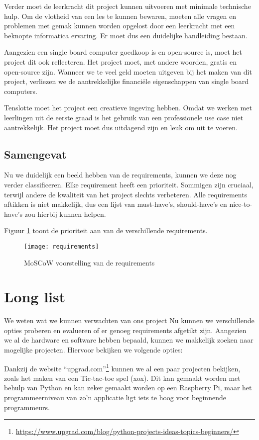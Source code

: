 Verder moet de leerkracht dit project kunnen uitvoeren met minimale technische hulp. Om de vlotheid van een les te kunnen bewaren, moeten alle vragen en problemen met gemak kunnen worden opgelost door een leerkracht met een beknopte informatica ervaring. Er moet dus een duidelijke handleiding bestaan.

Aangezien een single board computer goedkoop is en open-source is, moet het project dit ook reflecteren. Het project moet, met andere woorden, gratis en open-source zijn. Wanneer we te veel geld moeten uitgeven bij het maken van dit project, verliezen we de aantrekkelijke financiële eigenschappen van single board computers. 

Tenslotte moet het project een creatieve ingeving hebben. Omdat we werken met leerlingen uit de eerste graad is het gebruik van een professionele use case niet aantrekkelijk. Het project moet dus uitdagend zijn en leuk om uit te voeren.

\subsection{Samengevat}

Nu we duidelijk een beeld hebben van de requirements, kunnen we deze nog verder classificeren. Elke requirement heeft een prioriteit. Sommigen zijn cruciaal, terwijl andere de kwaliteit van het project slechts verbeteren. Alle requirements aftikken is niet makkelijk, dus een lijst van must-have’s, should-have’s en nice-to-have’s zou hierbij kunnen helpen.


Figuur \ref{fig:moscow} toont de prioriteit aan van de verschillende requirements.

\begin{figure}
   \texttt{[image: requirements]}
   \caption{MoSCoW voorstelling van de requirements}
   \label{fig:moscow}
\end{figure}

\section{Long list}

We weten wat we kunnen verwachten van ons project Nu kunnen we verschillende opties proberen en evalueren of er genoeg requirements afgetikt zijn. Aangezien we al de hardware en software hebben bepaald, kunnen we makkelijk zoeken naar mogelijke projecten. Hiervoor bekijken we volgende opties:

Dankzij de website “upgrad.com”\footnote{\url{https://www.upgrad.com/blog/python-projects-ideas-topics-beginners/}} kunnen we al een paar projecten bekijken, zoals het maken van een Tic-tac-toe spel (xox). Dit kan gemaakt worden met behulp van Python en kan zeker gemaakt worden op een Raspberry Pi, maar het programmeerniveau van zo’n applicatie ligt iets te hoog voor beginnende programmeurs. 

